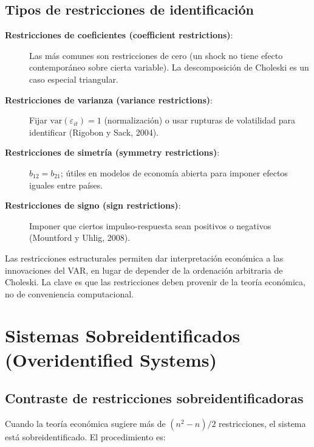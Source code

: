 \documentclass[12pt]{article}
\begin{document}
\subsection{Tipos de restricciones de identificaci\'on}

\begin{description}
  \item[\textbf{Restricciones de coeficientes (coefficient restrictions)}:] Las m\'as comunes son restricciones de cero (un shock no tiene efecto contempor\'aneo sobre cierta variable). La descomposici\'on de Choleski es un caso especial triangular.

  \item[\textbf{Restricciones de varianza (variance restrictions)}:] Fijar $\text{var}(\varepsilon_{it}) = 1$ (normalizaci\'on) o usar rupturas de volatilidad para identificar (Rigobon y Sack, 2004).

  \item[\textbf{Restricciones de simetr\'ia (symmetry restrictions)}:] $b_{12} = b_{21}$; \'utiles en modelos de econom\'ia abierta para imponer efectos iguales entre pa\'ises.

  \item[\textbf{Restricciones de signo (sign restrictions)}:] Imponer que ciertos impulso-respuesta sean positivos o negativos (Mountford y Uhlig, 2008).
\end{description}

\begin{intuicion}
Las restricciones estructurales permiten dar interpretaci\'on econ\'omica a las innovaciones del VAR, en lugar de depender de la ordenaci\'on arbitraria de Choleski. La clave es que las restricciones deben provenir de la teor\'ia econ\'omica, no de conveniencia computacional.
\end{intuicion}

\section{Sistemas Sobreidentificados (Overidentified Systems)}

\subsection{Contraste de restricciones sobreidentificadoras}

Cuando la teor\'ia econ\'omica sugiere m\'as de $(n^2-n)/2$ restricciones, el sistema est\'a sobreidentificado. El procedimiento es:
\end{document}
